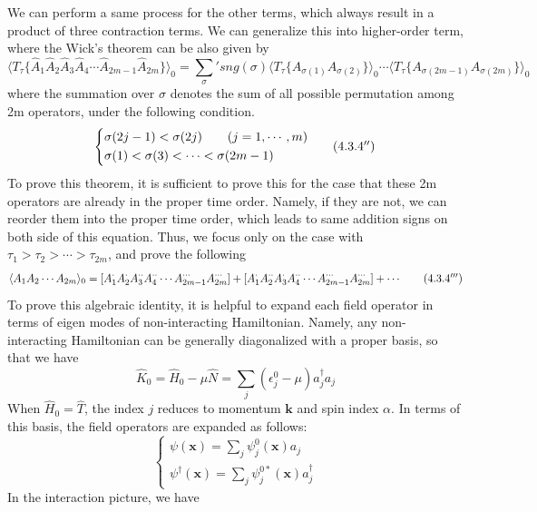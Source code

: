 We can perform a same process for the other terms, which always result in a product of three contraction terms.
We can generalize this into higher-order term, where the Wick's theorem can be also given by
\[
\langle T_\tau\{ \hat{A}_1\hat{A}_2\hat{A}_3\hat{A}_4 \cdots \hat{A}_{2m-1}\hat{A}_{2m}\}\rangle_0
={\sum_{\sigma}}' sng(\sigma)\langle T_\tau \{A_{\sigma(1)}A_{\sigma(2)}\}\rangle_0 \cdots \langle T_\tau\{A_{\sigma(2m-1)}A_{\sigma(2m)}\}\rangle_0 \tag{$4.3.4^\prime$}
\]
where the summation over $\sigma$ denotes the sum of all possible permutation among 2m operators, under the following condition.
\[
\left\{
\begin{aligned}
&\sigma(2j-1)<\sigma(2j)\qquad(j=1,\cdots,m)\\
&\sigma(1)<\sigma(3)<\cdots<\sigma(2m-1)
\end{aligned}\tag{$4.3.4^{\prime\prime}$}
\right.
\]
To prove this theorem, it is sufficient to prove this for the case that these 2m operators are already in the proper time order.
Namely, if they are not, we can reorder them into the proper time order, which leads to same addition signs on both side of this equation.
Thus, we focus only on the case with $\tau_1>\tau_2>\cdots>\tau_{2m}$, and prove the following
\[ \label{4.3.B}
\langle A_1A_2\cdots A_{2m}\rangle_0=[A_1^{\cdot} A_2^{\cdot} A_3^{\cdot\cdot} A_4^{\cdot\cdot} \cdots A_{2m-1}^{\cdots}A_{2m}^{\cdots}]
+[A_1^{\cdot} A_2^{\cdot\cdot} A_3^{\cdot} A_4^{\cdot\cdot} \cdots A_{2m-1}^{\cdots}A_{2m}^{\cdots}]+\cdots \tag{$4.3.4^{\prime\prime\prime}$}
\]
To prove this algebraic identity, it is helpful to expand each field operator in terms of eigen modes of non-interacting Hamiltonian.
Namely, any non-interacting Hamiltonian can be generally diagonalized with a proper basis, so that we have
\begin{equation}
\hat{K}_0=\hat{H}_0-\mu\hat{N}=\sum_j (\epsilon_j^0-\mu) a_j^\dagger a_j
\end{equation}
When $\hat{H}_0=\hat{T}$, the index $j$ reduces to momentum $\mathbf{k}$ and spin index $\alpha$.
In terms of this basis, the field operators are expanded as follows:
\begin{equation}
\left\{
\begin{aligned}
\psi(\mathbf{x})=\sum_j \psi_j^0(\mathbf{x})a_j\\
\psi^\dagger(\mathbf{x})=\sum_j \psi_j^{0*}(\mathbf{x})a_j^\dagger
\end{aligned}
\right.
\end{equation}
In the interaction picture, we have
